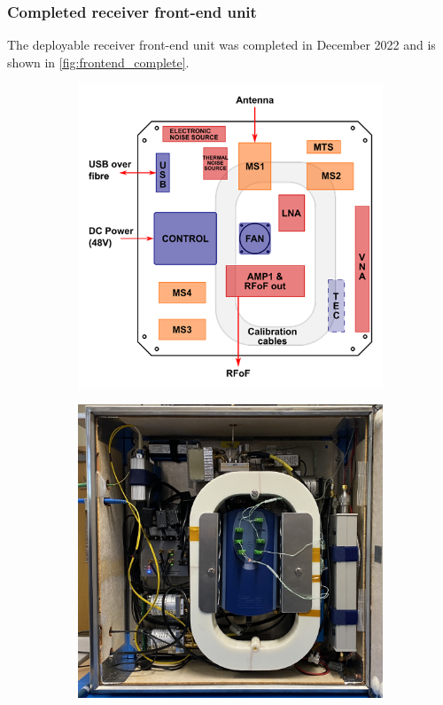 \subsubsection{Completed receiver front-end unit}
The deployable receiver front-end unit was completed in December 2022 and is shown in \cref{fig:frontend_complete}. 
\begin{figure}[t]
    \centering
    \centering
    \begin{subfigure}{.45\textwidth}
        \centering
        \includegraphics[width=\linewidth]{frontend_layout}
    \end{subfigure}
    \hfill
    \begin{subfigure}{.45\textwidth}
    \centering
        \includegraphics[width=\linewidth]{frontend.jpeg}

\end{subfigure}
\end{figure}
